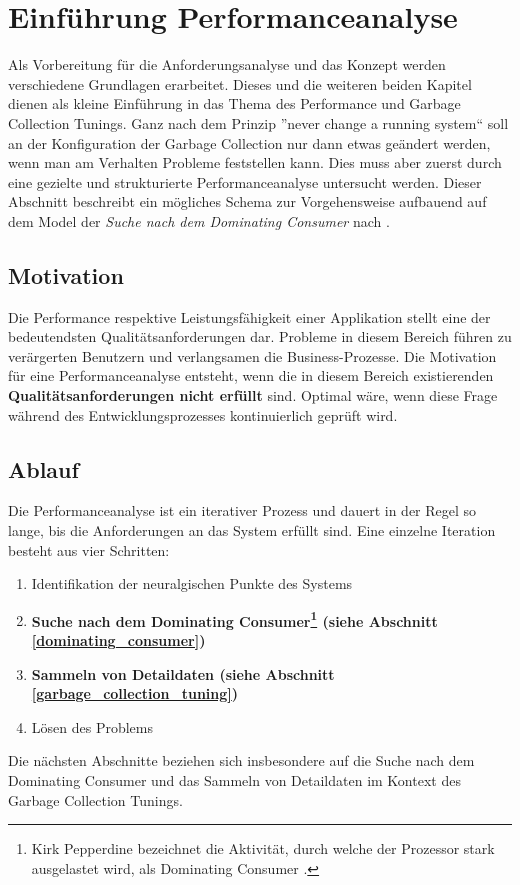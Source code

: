 \chapter{Einführung Performanceanalyse}
Als Vorbereitung für die Anforderungsanalyse und das Konzept werden verschiedene Grundlagen erarbeitet. Dieses und die weiteren beiden Kapitel dienen als kleine Einführung in das Thema des Performance und Garbage Collection Tunings.
Ganz nach dem Prinzip ''never change a running system`` soll an der Konfiguration der Garbage Collection nur dann etwas geändert werden, wenn man am Verhalten Probleme feststellen kann. Dies muss aber zuerst durch eine gezielte und strukturierte Performanceanalyse untersucht werden. Dieser Abschnitt beschreibt ein mögliches Schema zur Vorgehensweise aufbauend auf dem Model der \textit{Suche  nach dem Dominating Consumer} nach \cite{pepperdine201102}.

\section{Motivation}
Die Performance respektive Leistungsfähigkeit einer Applikation stellt eine der bedeutendsten Qualitätsanforderungen dar. Probleme in diesem Bereich führen zu verärgerten Benutzern und verlangsamen die Business-Prozesse. Die Motivation für eine Performanceanalyse entsteht, wenn die in diesem Bereich existierenden \textbf{Qualitätsanforderungen nicht erfüllt} sind. Optimal wäre, wenn diese Frage während des Entwicklungsprozesses kontinuierlich geprüft wird.

\section{Ablauf}
Die Performanceanalyse ist ein iterativer Prozess und dauert in der Regel so lange, bis die Anforderungen an das System erfüllt sind. Eine einzelne Iteration besteht aus vier Schritten\cite{hummelBeer201109}:
\begin{enumerate}
	\item Identifikation der neuralgischen Punkte des Systems
	\item \textbf{Suche nach dem Dominating Consumer\footnote{Kirk Pepperdine bezeichnet die Aktivität, durch welche der Prozessor stark ausgelastet wird, als Dominating Consumer . } (siehe Abschnitt \ref{dominating_consumer})}
	\item \textbf{Sammeln von Detaildaten (siehe Abschnitt \ref{garbage_collection_tuning})}
	\item Lösen des Problems
\end{enumerate}
Die nächsten Abschnitte beziehen sich insbesondere auf die Suche nach dem Dominating Consumer und das Sammeln von Detaildaten im Kontext des Garbage Collection Tunings.

